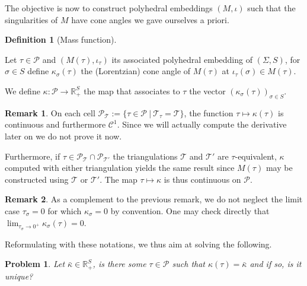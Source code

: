 \documentclass[a4paper,12pt]{article}
\def\TT{\mathcal T}
\def\adm{\P}
\def\RR{\mathbb{R}}
\def\adm{\mathcal{P}}
\def\P{\mathcal{P}}
\def\CellPSigma{\P_\TT}
\newtheorem*{problem}{Problem}
\theoremstyle{definition}
\newtheorem{defi}[lem]{Definition}	%
\newtheorem*{rem}{Remark}			 %
\begin{document}
				The objective is now to construct polyhedral embeddings $(M,\iota)$ such that the singularities of $M$ have cone angles we gave ourselves a priori.
				\begin{defi}[Mass function]\label{def:mass_function}

				Let $\tau \in \adm$ and $(M(\tau),\iota_\tau)$ its associated polyhedral embedding of $(\Sigma, S)$, for $\sigma\in S$ define $\kappa_\sigma(\tau)$ the (Lorentzian) cone angle of $M(\tau)$ at $\iota_\tau(\sigma) \in M(\tau)$.

				We define $\kappa: \adm \rightarrow \RR_+^{S}$ the map that associates to $\tau$ the vector $(\kappa_\sigma(\tau))_{\sigma\in S}$.
				\end{defi}
				\begin{rem}\label{rem:cell_function_continuous_furthermore} On each cell $\CellPSigma:=\{\tau\in \adm ~|~ \TT_\tau=\TT \}$, the function $\tau \mapsto \kappa(\tau)$ is continuous and furthermore $\mathscr C^1$. Since we will actually compute the derivative later on we do not prove it now. 
				
				Furthermore, if $\tau \in \CellPSigma\cap \P_{\TT'}$ the triangulations $\TT$ and $\TT'$ are $\tau$-equivalent, $\kappa$ computed with either triangulation yields the same result since $M(\tau)$ may be constructed using $\TT$ or $\TT'$. The map $\tau\mapsto \kappa$ is thus continuous on $\adm$.
				\end{rem}
				\begin{rem}\label{rem:complement_previous_remark_do}
				 As a complement to the previous remark, we do not neglect the limit case $\tau_\sigma = 0$ for which $\kappa_\sigma=0$ by convention. One may check directly that $\lim_{\tau_\sigma\rightarrow 0^+} \kappa_\sigma(\tau)=0$.
				\end{rem}

				Reformulating with these notations, we thus aim at solving the following.
				\begin{problem}\label{prob:kappa_bar}
				 Let $\bar\kappa \in \RR_+^{S}$, is there some $\tau\in \adm$ such that $\kappa(\tau)=\bar\kappa$ and if so, is it unique?
				\end{problem}
				
\end{document}
